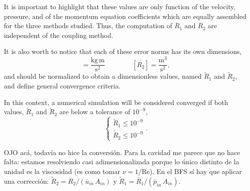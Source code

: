 \documentclass[final,3p,times,11pt,onecolumn]{myElsarticle}
\numberwithin{equation}{section}
\newcommand{\CIP}[1]{{\color{blue} #1}}
\begin{document}
It is important to highlight that these values are only function of the velocity, pressure, and of the momentum equation coefficients which are equally assembled for the three methods studied. Thus, the computation of $\overline{R}_1$ and $\overline{R}_2$ are independent of the coupling method.

It is also worth to notice that each of these error norms has its own dimensions,%
\begin{equation}
[\overline{R_1}]
=
\frac{\text{kg}\,\text{m}}{\text{s}^2}
\qquad \qquad
[\overline{R_2}]
=
\frac{\text{m}^3}{\text{s}^2},
\end{equation}
and should be normalized to obtain a dimensionless values, named $\tilde{R}_1$ and $\tilde{R}_2$, and define general convergence criteria.

In this context, a numerical simulation will be considered converged if both values, $\tilde{R}_1$ and $\tilde{R}_2$  are below a tolerance of $10^{-9}$,
\begin{equation} \label{Eq:convergencecriterion}
\left\lbrace
\begin{array}{c}
\tilde{R}_1 \leq 10^{-9} \\
\tilde{R}_2 \leq 10^{-9}
\end{array}
\right..
\end{equation}

\CIP{OJO acá, todavía no hice la conversión. Para la cavidad me parece que no hace falta: estamos resolviendo casi adimensionalizada porque lo único distinto de la unidad es la viscosidad (es como tomar $\nu = 1$/Re). En el BFS sí hay que aplicar una corrección: $\tilde{R}_2 = \overline{R}_2/(\overline{u}_{in}\,A_{in})$ y $\tilde{R}_1 = \overline{R}_1/(\overline{p}_{in}\,A_{in})$.}
\end{document}
